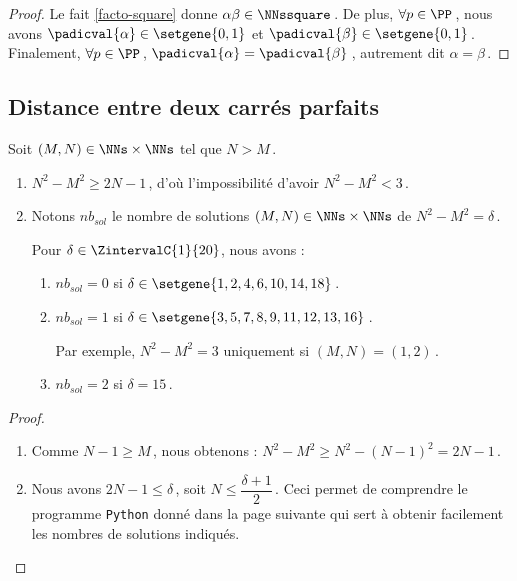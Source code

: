 \begin{proof}
	Le fait \ref{facto-square} donne $\alpha \beta \in \NNssquare$\,.
	De plus, $\forall p \in \PP$\,, nous avons 
	$\padicval{\alpha} \in \setgene{0, 1}$
	et
	$\padicval{\beta} \in \setgene{0, 1}$\,.
	Finalement, $\forall p \in \PP$\,, $\padicval{\alpha} = \padicval{\beta}$\,, autrement dit $\alpha = \beta$\,.
\end{proof}




\subsection{Distance entre deux carrés parfaits}

\begin{fact} \label{diff-square-ko}
	Soit $(M, N) \in \NNs \times \NNs$ tel que $N > M$\,.
	\begin{enumerate}
		\item $N^2 - M^2 \geq 2N - 1$\,, 
		d'où l'impossibilité d'avoir
		$N^2 - M^2 < 3$\,.
		
		\item Notons $nb_{sol}$ le nombre de solutions $(M, N) \in \NNs \times \NNs$ de $N^2 - M^2 = \delta$\,.
				
		\smallskip
		\noindent
		Pour $\delta \in \ZintervalC{1}{20}$, nous avons :
		\begin{enumerate}
			\item $nb_{sol}= 0$ si $\delta \in \setgene{1, 2, 4, 6, 10, 14, 18}$\,.

			\item $nb_{sol}= 1$ si $\delta \in \setgene{3, 5, 7, 8, 9, 11, 12, 13, 16}$\,.
			
			Par exemple, $N^2 - M^2 = 3$ uniquement si $(M, N) = (1, 2)$\,.

			\item $nb_{sol}= 2$ si $\delta = 15$\,.
		\end{enumerate}
	\end{enumerate}
\end{fact}


\begin{proof}
	\leavevmode
	
	\vspace{-1ex}
	\begin{enumerate}
		\item Comme $N - 1 \geq M$\,, nous obtenons :
		$N^2 - M^2 \geq N^2 - (N - 1)^2 = 2N - 1$\,.		

		\item Nous avons $2 N - 1 \leq \delta$\,, soit $N  \leq \dfrac{\delta + 1}{2}$\,.
		Ceci permet de comprendre le programme \verb#Python# donné dans la page suivante qui sert à obtenir facilement les nombres de solutions indiqués.
		\qedhere
	\end{enumerate}
\end{proof}

